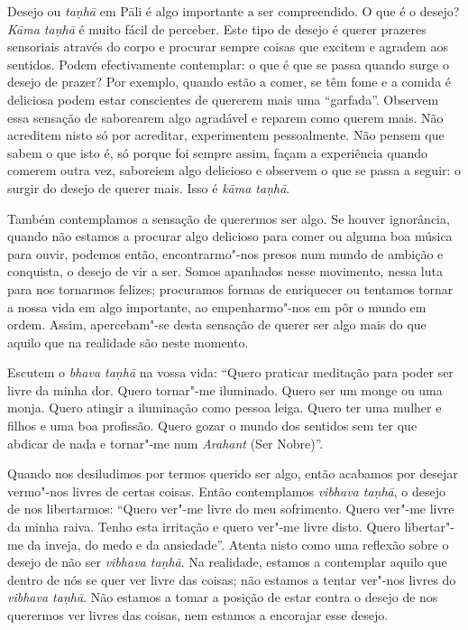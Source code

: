 Desejo ou \emph{taṇhā} em Pāli é algo importante a ser compreendido. O que é o
desejo? \emph{Kāma taṇhā} é muito fácil de perceber. Este tipo de desejo é
querer prazeres sensoriais através do corpo e procurar sempre coisas que excitem
e agradem aos sentidos. Podem efectivamente contemplar: o que é que se passa
quando surge o desejo de prazer? Por exemplo, quando estão a comer, se têm fome
e a comida é deliciosa podem estar conscientes de quererem mais uma “garfada”.
Observem essa sensação de saborearem algo agradável e reparem como querem mais.
Não acreditem nisto só por acreditar, experimentem pessoalmente. Não pensem que
sabem o que isto é, só porque foi sempre assim, façam a experiência quando
comerem outra vez, saboreiem algo delicioso e observem o que se passa a seguir:
o surgir do desejo de querer mais. Isso é \emph{kāma taṇhā}.

Também contemplamos a sensação de querermos ser algo. Se houver ignorância,
quando não estamos a procurar algo delicioso para comer ou alguma boa música
para ouvir, podemos então, encontrarmo"-nos presos num mundo de ambição e
conquista, o desejo de vir a ser. Somos apanhados nesse movimento, nessa luta
para nos tornarmos felizes; procuramos formas de enriquecer ou tentamos tornar a
nossa vida em algo importante, ao empenharmo"-nos em pôr o mundo em ordem. Assim,
apercebam"-se desta sensação de querer ser algo mais do que aquilo que na
realidade são neste momento.

Escutem o \emph{bhava taṇhā} na vossa vida: “Quero praticar meditação para poder
ser livre da minha dor. Quero tornar"-me iluminado. Quero ser um monge ou uma
monja. Quero atingir a iluminação como pessoa leiga. Quero ter uma mulher e
filhos e uma boa profissão. Quero gozar o mundo dos sentidos sem ter que abdicar
de nada e tornar"-me num \emph{Arahant} (Ser Nobre)”.

Quando nos desiludimos por termos querido ser algo, então acabamos por desejar
vermo"-nos livres de certas coisas. Então contemplamos \emph{vibhava taṇhā}, o
desejo de nos libertarmos: “Quero ver"-me livre do meu sofrimento. Quero ver"-me
livre da minha raiva. Tenho esta irritação e quero ver"-me livre disto. Quero
libertar"-me da inveja, do medo e da ansiedade”. Atenta nisto como uma reflexão
sobre o desejo de não ser \emph{vibhava taṇhā}. Na realidade, estamos a
contemplar aquilo que dentro de nós se quer ver livre das coisas; não estamos a
tentar ver"-nos livres do \emph{vibhava taṇhā}. Não estamos a tomar a posição de
estar contra o desejo de nos querermos ver livres das coisas, nem estamos a
encorajar esse desejo.

